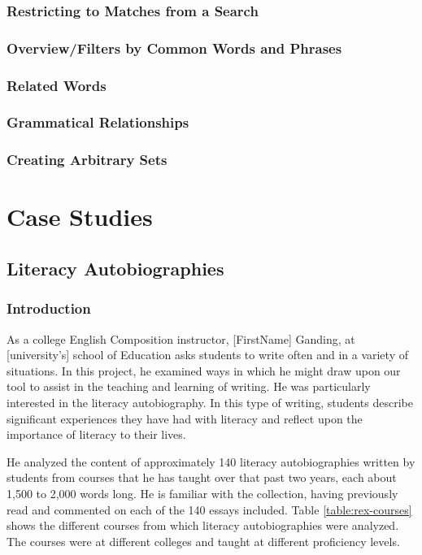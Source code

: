 \documentclass{sig-alternate}
\begin{document}
\subsubsection{Restricting to Matches from a Search}


\subsubsection{Overview/Filters by Common Words and Phrases }


\subsubsection{Related Words}

\subsubsection{Grammatical Relationships}

\subsubsection {Creating Arbitrary Sets}

\section{Case Studies}

\subsection{Literacy Autobiographies}

\subsubsection{Introduction}
As a college English Composition instructor,  [FirstName] Ganding, at  [university's] school of Education asks students to write often and in a variety of situations. In this project, he examined ways in which he might draw upon our tool to assist in the teaching and learning of writing. He was particularly interested in the literacy autobiography. In this type of writing, students describe significant experiences they have had with literacy and reflect upon the importance of literacy to their lives.  

He analyzed the content of approximately 140 literacy autobiographies written by students from courses that he has taught over that past two years, each about 1,500 to 2,000 words long. He is familiar with the collection, having previously read and commented on each of the 140 essays included.  Table \ref{table:rex-courses} shows the different courses from which literacy autobiographies were analyzed. The courses were at different colleges and taught at different proficiency levels.
\end{document}
